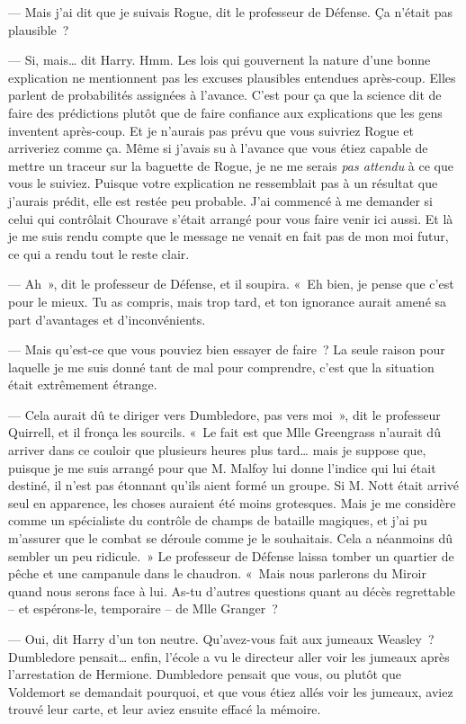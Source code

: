 --- Mais j'ai dit que je suivais Rogue, dit le professeur de Défense.
Ça n'était pas plausible~?

--- Si, mais… dit Harry.
Hmm. Les lois qui gouvernent la nature d'une bonne explication ne mentionnent pas les excuses plausibles entendues après-coup.
Elles parlent de probabilités assignées à l'avance.
C'est pour ça que la science dit de faire des prédictions plutôt que de faire confiance aux explications que les gens inventent après-coup.
Et je n'aurais pas prévu que vous suivriez Rogue et arriveriez comme ça.
Même si j'avais su à l'avance que vous étiez capable de mettre un traceur sur la baguette de Rogue, je ne me serais \emph{pas attendu} à ce que vous le suiviez.
Puisque votre explication ne ressemblait pas à un résultat que j'aurais prédit, elle est restée peu probable.
J'ai commencé à me demander si celui qui contrôlait Chourave s'était arrangé pour vous faire venir ici aussi.
Et là je me suis rendu compte que le message ne venait en fait pas de mon moi futur, ce qui a rendu tout le reste clair.

--- Ah~», dit le professeur de Défense, et il soupira.
«~Eh bien, je pense que c'est pour le mieux.
Tu as compris, mais trop tard, et ton ignorance aurait amené sa part d'avantages et d'inconvénients.

--- Mais qu'est-ce que vous pouviez bien essayer de faire~?
La seule raison pour laquelle je me suis donné tant de mal pour comprendre, c'est que la situation était extrêmement étrange.

--- Cela aurait dû te diriger vers Dumbledore, pas vers moi~», dit le professeur Quirrell, et il fronça les sourcils.
«~Le fait est que Mlle Greengrass n'aurait dû arriver dans ce couloir que plusieurs heures plus tard… mais je suppose que, puisque je me suis arrangé pour que M. Malfoy lui donne l'indice qui lui était destiné, il n'est pas étonnant qu'ils aient formé un groupe.
Si M. Nott était arrivé seul en apparence, les choses auraient été moins grotesques.
Mais je me considère comme un spécialiste du contrôle de champs de bataille magiques, et j'ai pu m'assurer que le combat se déroule comme je le souhaitais.
Cela a néanmoins dû sembler un peu ridicule.~»
Le professeur de Défense laissa tomber un quartier de pêche et une campanule dans le chaudron.
«~Mais nous parlerons du Miroir quand nous serons face à lui.
As-tu d'autres questions quant au décès regrettable -- et espérons-le, temporaire -- de Mlle Granger~?

--- Oui, dit Harry d'un ton neutre.
Qu'avez-vous fait aux jumeaux Weasley~?
Dumbledore pensait… enfin, l'école a vu le directeur aller voir les jumeaux après l'arrestation de Hermione.
Dumbledore pensait que vous, ou plutôt que Voldemort se demandait pourquoi, et que vous étiez allés voir les jumeaux, aviez trouvé leur carte, et leur aviez ensuite effacé la mémoire.

